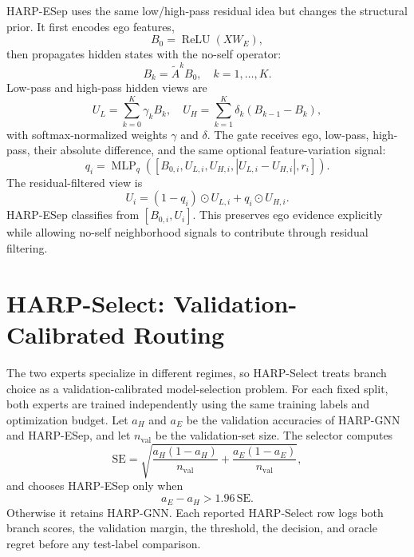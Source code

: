 \documentclass[letterpaper]{article} %
\newcommand{\base}{HARP-GNN}
\newcommand{\esep}{HARP-ESep}
\newcommand{\method}{HARP-Select}
\begin{document}
\esep{} uses the same low/high-pass residual idea but changes the structural prior.
It first encodes ego features,
\begin{equation}
  B_0=\operatorname{ReLU}(XW_E),
\end{equation}
then propagates hidden states with the no-self operator:
\begin{equation}
  B_k=\tilde{A}^{k}B_0,\quad k=1,\ldots,K.
\end{equation}
Low-pass and high-pass hidden views are
\begin{equation}
  U_L=\sum_{k=0}^{K}\gamma_kB_k,\quad
  U_H=\sum_{k=1}^{K}\delta_k(B_{k-1}-B_k),
\end{equation}
with softmax-normalized weights $\gamma$ and $\delta$.
The gate receives ego, low-pass, high-pass, their absolute difference, and the same optional feature-variation signal:
\begin{equation}
  q_i=\operatorname{MLP}_q([B_{0,i},U_{L,i},U_{H,i},|U_{L,i}-U_{H,i}|,r_i]).
\end{equation}
The residual-filtered view is
\begin{equation}
  U_i=(1-q_i)\odot U_{L,i}+q_i\odot U_{H,i}.
\end{equation}
\esep{} classifies from $[B_{0,i},U_i]$.
This preserves ego evidence explicitly while allowing no-self neighborhood signals to contribute through residual filtering.

\section{\method{}: Validation-Calibrated Routing}

The two experts specialize in different regimes, so \method{} treats branch choice as a validation-calibrated model-selection problem.
For each fixed split, both experts are trained independently using the same training labels and optimization budget.
Let $a_H$ and $a_E$ be the validation accuracies of \base{} and \esep, and let $n_{\mathrm{val}}$ be the validation-set size.
The selector computes
\begin{equation}
  \mathrm{SE}=
  \sqrt{\frac{a_H(1-a_H)}{n_{\mathrm{val}}}+
        \frac{a_E(1-a_E)}{n_{\mathrm{val}}}},
\label{eq:selector-se}
\end{equation}
and chooses \esep{} only when
\begin{equation}
  a_E-a_H>1.96\,\mathrm{SE}.
\label{eq:selector-rule}
\end{equation}
Otherwise it retains \base.
Each reported \method{} row logs both branch scores, the validation margin, the threshold, the decision, and oracle regret before any test-label comparison.
\end{document}
